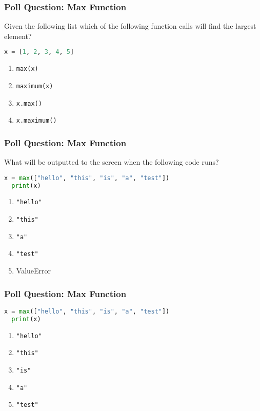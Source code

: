 \documentclass[xcolor=table]{beamer}
\begin{document}
%
%
\begin{frame}[fragile]
  \frametitle{Poll Question: Max Function} 
  Given the following list which of the following function calls will find the largest element?
  \begin{lstlisting}[language=Python, autogobble]
  x = [1, 2, 3, 4, 5]
  \end{lstlisting}
  \vfill
  \begin{enumerate}[A] 
    \item \lstinline|max(x)|
    \item \lstinline|maximum(x)|
    \item \lstinline|x.max()|
    \item \lstinline|x.maximum()|
  \end{enumerate}
\end{frame}


%
%
\begin{frame}[fragile]
  \frametitle{Poll Question: Max Function} 
  What will be outputted to the screen when the following code runs?
  \begin{lstlisting}[language=Python, autogobble]
  x = max(["hello", "this", "is", "a", "test"])
  print(x)
  \end{lstlisting}
  \vfill
  \begin{enumerate}[A] 
    \item \lstinline|"hello"|
    \item \lstinline|"this"|
    \item \lstinline|"a"|
    \item \lstinline|"test"|
    \item ValueError
  \end{enumerate}
\end{frame}


%
%
\begin{frame}[fragile]
  \frametitle{Poll Question: Max Function} 
  \begin{lstlisting}[language=Python, autogobble]
  x = max(["hello", "this", "is", "a", "test"])
  print(x)
  \end{lstlisting}
  \vfill
  \begin{enumerate}[A] 
    \item \lstinline|"hello"|
    \item \lstinline|"this"|
    \item \lstinline|"is"|
    \item \lstinline|"a"|
    \item \lstinline|"test"|
  \end{enumerate}
\end{frame}
\end{document}
